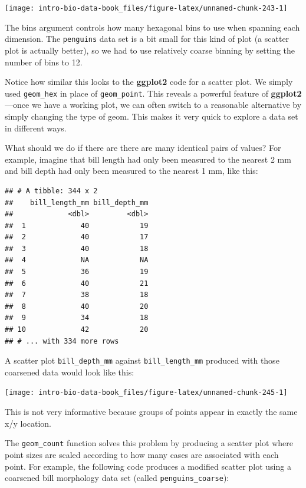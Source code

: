 \documentclass[
]{book}
\begin{document}
\begin{center}\texttt{[image: intro-bio-data-book\_files/figure-latex/unnamed-chunk-243-1]} \end{center}

The bins argument controls how many hexagonal bins to use when spanning each dimension. The \texttt{penguins} data set is a bit small for this kind of plot (a scatter plot is actually better), so we had to use relatively coarse binning by setting the number of bins to 12.

Notice how similar this looks to the \textbf{ggplot2} code for a scatter plot. We simply used \texttt{geom\_hex} in place of \texttt{geom\_point}. This reveals a powerful feature of \textbf{ggplot2}---once we have a working plot, we can often switch to a reasonable alternative by simply changing the type of geom. This makes it very quick to explore a data set in different ways.

What should we do if there are there are many identical pairs of values? For example, imagine that bill length had only been measured to the nearest 2 mm and bill depth had only been measured to the nearest 1 mm, like this:

\begin{verbatim}
## # A tibble: 344 x 2
##    bill_length_mm bill_depth_mm
##             <dbl>         <dbl>
##  1             40            19
##  2             40            17
##  3             40            18
##  4             NA            NA
##  5             36            19
##  6             40            21
##  7             38            18
##  8             40            20
##  9             34            18
## 10             42            20
## # ... with 334 more rows
\end{verbatim}

A scatter plot \texttt{bill\_depth\_mm} against \texttt{bill\_length\_mm} produced with those coarsened data would look like this:

\begin{center}\texttt{[image: intro-bio-data-book\_files/figure-latex/unnamed-chunk-245-1]} \end{center}

This is not very informative because groups of points appear in exactly the same x/y location.

The \texttt{geom\_count} function solves this problem by producing a scatter plot where point sizes are scaled according to how many cases are associated with each point. For example, the following code produces a modified scatter plot using a coarsened bill morphology data set (called \texttt{penguins\_coarse}):
\end{document}
